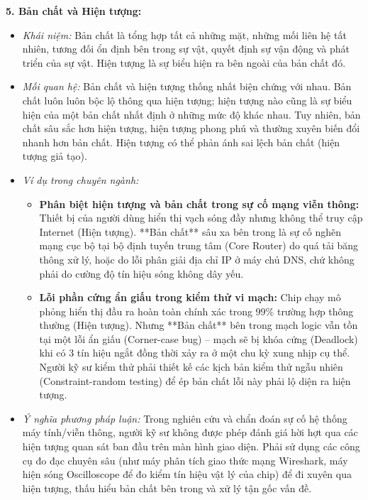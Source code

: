 \documentclass[12pt,a4paper]{article}
\begin{document}
{\noindent
\textbf{5. Bản chất và Hiện tượng:}
\begin{itemize}
    \item \textit{Khái niệm:} Bản chất là tổng hợp tất cả những mặt, những mối liên hệ tất nhiên, tương đối ổn định bên trong sự vật, quyết định sự vận động và phát triển của sự vật. Hiện tượng là sự biểu hiện ra bên ngoài của bản chất đó.
    \item \textit{Mối quan hệ:} Bản chất và hiện tượng thống nhất biện chứng với nhau. Bản chất luôn luôn bộc lộ thông qua hiện tượng; hiện tượng nào cũng là sự biểu hiện của một bản chất nhất định ở những mức độ khác nhau. Tuy nhiên, bản chất sâu sắc hơn hiện tượng, hiện tượng phong phú và thường xuyên biến đổi nhanh hơn bản chất. Hiện tượng có thể phản ánh sai lệch bản chất (hiện tượng giả tạo).
    \item \textit{Ví dụ trong chuyên ngành:}
    \begin{itemize}
        \item \textbf{Phân biệt hiện tượng và bản chất trong sự cố mạng viễn thông:} Thiết bị của người dùng hiển thị vạch sóng đầy nhưng không thể truy cập Internet (Hiện tượng). **Bản chất** sâu xa bên trong là sự cố nghẽn mạng cục bộ tại bộ định tuyến trung tâm (Core Router) do quá tải băng thông xử lý, hoặc do lỗi phân giải địa chỉ IP ở máy chủ DNS, chứ không phải do cường độ tín hiệu sóng không dây yếu.
        \item \textbf{Lỗi phần cứng ẩn giấu trong kiểm thử vi mạch:} Chip chạy mô phỏng hiển thị đầu ra hoàn toàn chính xác trong 99\% trường hợp thông thường (Hiện tượng). Nhưng **Bản chất** bên trong mạch logic vẫn tồn tại một lỗi ẩn giấu (Corner-case bug) -- mạch sẽ bị khóa cứng (Deadlock) khi có 3 tín hiệu ngắt đồng thời xảy ra ở một chu kỳ xung nhịp cụ thể. Người kỹ sư kiểm thử phải thiết kế các kịch bản kiểm thử ngẫu nhiên (Constraint-random testing) để ép bản chất lỗi này phải lộ diện ra hiện tượng.
    \end{itemize}
    \item \textit{Ý nghĩa phương pháp luận:} Trong nghiên cứu và chẩn đoán sự cố hệ thống máy tính/viễn thông, người kỹ sư không được phép đánh giá hời hợt qua các hiện tượng quan sát ban đầu trên màn hình giao diện. Phải sử dụng các công cụ đo đạc chuyên sâu (như máy phân tích giao thức mạng Wireshark, máy hiện sóng Oscilloscope để đo kiểm tín hiệu vật lý của chip) để đi xuyên qua hiện tượng, thấu hiểu bản chất bên trong và xử lý tận gốc vấn đề.
\end{itemize}

}
\end{document}
